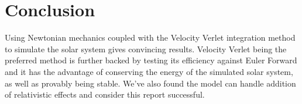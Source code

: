 \documentclass[../main.tex]{subfiles}
\begin{document}
\section{Conclusion}\label{sec:conclusion}
Using Newtonian mechanics coupled with the Velocity Verlet integration method to simulate the solar system gives convincing results. Velocity Verlet being the preferred method is further backed by testing its efficiency against Euler Forward and it has the advantage of conserving the energy of the simulated solar system, as well as provably being stable. We've also found the model can handle addition of relativistic effects and consider this report successful.
\end{document}
